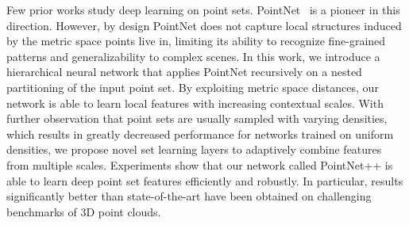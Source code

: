 
Few prior works study deep learning on point sets.
PointNet~\cite{qi2016pointnet} is a pioneer in this direction. However, by design PointNet does not capture local structures induced by the metric space points live in, limiting its ability to recognize fine-grained patterns and generalizability to complex scenes.
In this work, we introduce a hierarchical neural network that applies PointNet recursively on a nested partitioning of the input point set. By exploiting metric space distances, our network is able to learn local features with increasing contextual scales.
With further observation that point sets are usually sampled with varying densities, which results in greatly decreased performance for networks trained on uniform densities, we propose novel set learning layers to adaptively combine features from multiple scales.
Experiments show that our network called PointNet++ is able to learn deep point set features efficiently and robustly. In particular, results significantly better than state-of-the-art have been obtained on challenging benchmarks of 3D point clouds.